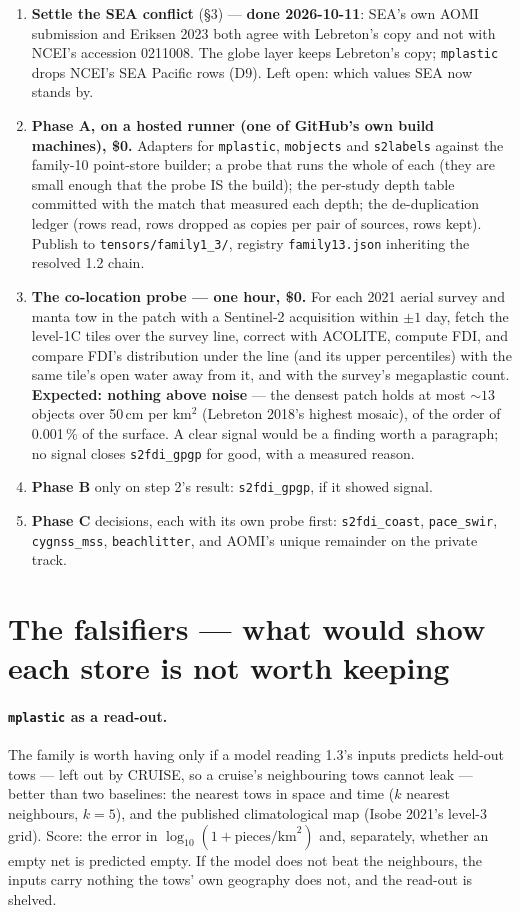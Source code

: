 \documentclass[10pt]{article}
\newcommand{\code}[1]{\texttt{#1}}
\begin{document}
\begin{enumerate}\itemsep2pt
\item[\textbf{0}] \textbf{Settle the SEA conflict} (\S3) --- \textbf{done 2026-10-11}: SEA's own AOMI submission
and Eriksen 2023 both agree with Lebreton's copy and not with NCEI's accession 0211008. The globe layer keeps
Lebreton's copy; \code{mplastic} drops NCEI's SEA Pacific rows (D9). Left open: which values SEA now stands by.
\item[\textbf{1}] \textbf{Phase A, on a hosted runner (one of GitHub's own build machines), \$0.} Adapters for
\code{mplastic}, \code{mobjects} and \code{s2labels} against the family-10 point-store builder; a probe that runs
the whole of each (they are small enough that the probe IS the build); the per-study depth table committed with the
match that measured each depth; the de-duplication ledger (rows read, rows dropped as copies per pair of sources,
rows kept). Publish to \code{tensors/family1\_3/}, registry \code{family13.json} inheriting the resolved 1.2 chain.
\item[\textbf{2}] \textbf{The co-location probe --- one hour, \$0.} For each 2021 aerial survey and manta tow in
the patch with a Sentinel-2 acquisition within $\pm 1$ day, fetch the level-1C tiles over the survey line, correct
with ACOLITE, compute FDI, and compare FDI's distribution under the line (and its upper percentiles) with the same
tile's open water away from it, and with the survey's megaplastic count. \textbf{Expected: nothing above noise} ---
the densest patch holds at most $\sim 13$ objects over 50\,cm per km$^2$ (Lebreton 2018's highest mosaic), of the
order of 0.001\,\% of the surface. A clear signal would be a finding worth a paragraph; no signal closes
\code{s2fdi\_gpgp} for good, with a measured reason.
\item[\textbf{3}] \textbf{Phase B} only on step 2's result: \code{s2fdi\_gpgp}, if it showed signal.
\item[\textbf{4}] \textbf{Phase C} decisions, each with its own probe first: \code{s2fdi\_coast}, \code{pace\_swir},
\code{cygnss\_mss}, \code{beachlitter}, and AOMI's unique remainder on the private track.
\end{enumerate}

\section{The falsifiers --- what would show each store is not worth keeping}

\paragraph{\code{mplastic} as a read-out.} The family is worth having only if a model reading 1.3's inputs
predicts held-out tows --- left out by CRUISE, so a cruise's neighbouring tows cannot leak --- better than two
baselines: the nearest tows in space and time ($k$ nearest neighbours, $k = 5$), and the published climatological
map (Isobe 2021's level-3 grid). Score: the error in $\log_{10}(1 + \text{pieces/km}^2)$ and, separately, whether an
empty net is predicted empty. If the model does not beat the neighbours, the inputs carry nothing the tows' own
geography does not, and the read-out is shelved.
\end{document}

